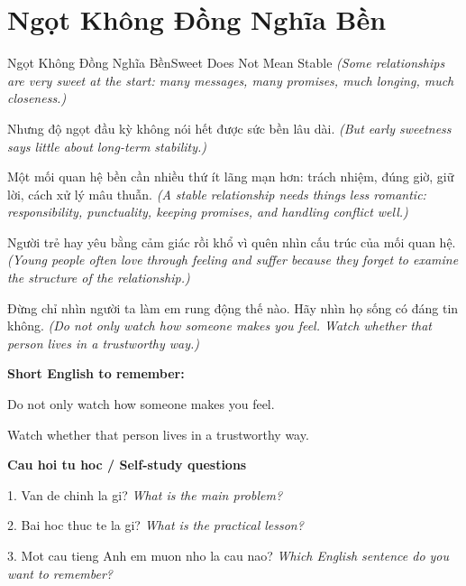 \section{Ngọt Không Đồng Nghĩa Bền}
\begin{truyen}{Ngọt Không Đồng Nghĩa Bền}{Sweet Does Not Mean Stable}
\textit{(Some relationships are very sweet at the start: many messages, many promises, much longing, much closeness.)}

Nhưng độ ngọt đầu kỳ không nói hết được sức bền lâu dài.
\textit{(But early sweetness says little about long-term stability.)}

Một mối quan hệ bền cần nhiều thứ ít lãng mạn hơn: trách nhiệm, đúng giờ, giữ lời, cách xử lý mâu thuẫn.
\textit{(A stable relationship needs things less romantic: responsibility, punctuality, keeping promises, and handling conflict well.)}

Người trẻ hay yêu bằng cảm giác rồi khổ vì quên nhìn cấu trúc của mối quan hệ.
\textit{(Young people often love through feeling and suffer because they forget to examine the structure of the relationship.)}

\end{truyen}

\begin{baihoc}
Đừng chỉ nhìn người ta làm em rung động thế nào. Hãy nhìn họ sống có đáng tin không.
\textit{(Do not only watch how someone makes you feel. Watch whether that person lives in a trustworthy way.)}
\end{baihoc}

\begin{ghinhoanh}
\textbf{Short English to remember:}

Do not only watch how someone makes you feel.

Watch whether that person lives in a trustworthy way.

\end{ghinhoanh}

\begin{tuhocnhanh}
\textbf{Cau hoi tu hoc / Self-study questions}

1. Van de chinh la gi? \textit{What is the main problem?}

2. Bai hoc thuc te la gi? \textit{What is the practical lesson?}

3. Mot cau tieng Anh em muon nho la cau nao? \textit{Which English sentence do you want to remember?}
\end{tuhocnhanh}
\ngancach

